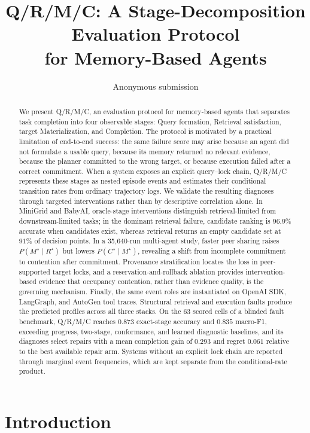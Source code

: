 \documentclass[letterpaper]{article} %
\title{Q/R/M/C: A Stage-Decomposition Evaluation Protocol\\for Memory-Based Agents}
\author{Anonymous submission}
\begin{document}
\maketitle

\begin{abstract}
We present Q/R/M/C, an evaluation protocol for memory-based agents that separates task completion into four observable stages: Query formation, Retrieval satisfaction, target Materialization, and Completion. The protocol is motivated by a practical limitation of end-to-end success: the same failure score may arise because an agent did not formulate a usable query, because its memory returned no relevant evidence, because the planner committed to the wrong target, or because execution failed after a correct commitment. When a system exposes an explicit query--lock chain, Q/R/M/C represents these stages as nested episode events and estimates their conditional transition rates from ordinary trajectory logs. We validate the resulting diagnoses through targeted interventions rather than by descriptive correlation alone. In MiniGrid and BabyAI, oracle-stage interventions distinguish retrieval-limited from downstream-limited tasks; in the dominant retrieval failure, candidate ranking is $96.9\%$ accurate when candidates exist, whereas retrieval returns an empty candidate set at $91\%$ of decision points. In a 35{,}640-run multi-agent study, faster peer sharing raises $P(M^\star\mid R^\star)$ but lowers $P(C^\star\mid M^\star)$, revealing a shift from incomplete commitment to contention after commitment. Provenance stratification locates the loss in peer-supported target locks, and a reservation-and-rollback ablation provides intervention-based evidence that occupancy contention, rather than evidence quality, is the governing mechanism. Finally, the same event roles are instantiated on OpenAI SDK, LangGraph, and AutoGen tool traces. Structural retrieval and execution faults produce the predicted profiles across all three stacks. On the 63 scored cells of a blinded fault benchmark, Q/R/M/C reaches $0.873$ exact-stage accuracy and $0.835$ macro-F1, exceeding progress, two-stage, conformance, and learned diagnostic baselines, and its diagnoses select repairs with a mean completion gain of $0.293$ and regret $0.061$ relative to the best available repair arm. Systems without an explicit lock chain are reported through marginal event frequencies, which are kept separate from the conditional-rate product.
\end{abstract}

\section{Introduction}
\end{document}
